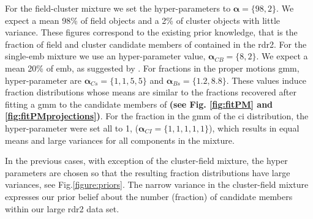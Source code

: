 For the field-cluster mixture we set the hyper-parameters to $\boldsymbol{\alpha}=\{98,2\}$. We expect a mean 98\% of field objects and a 2\% of cluster objects with little variance. These figures correspond to the existing prior knowledge, that is the fraction of field and cluster candidate members of \citet{Bouy2015} contained in the \gls{rdr2}. 
For the single-\gls{emb} mixture we use an hyper-parameter value, $\boldsymbol{\alpha}_{CB}=\{8,2\}$. We expect a mean 20\% of \gls{emb}, as suggested by \citet{Bouy2015}. 
For fractions in the proper motions \gls{gmm}, hyper-parameter are $\boldsymbol{\alpha}_{Cs}=\{1,1,5,5\}$ and $\boldsymbol{\alpha}_{Bs}=\{1.2,8.8\}$. These values induce fraction distributions whose means are similar to the fractions recovered after fitting a \gls{gmm} to the  candidate members of \citet{Bouy2015} \textbf{(see Fig. \ref{fig:fitPM} and \ref{fig:fitPMprojections})}. 
For the fraction in the \gls{gmm} of the \gls{ci} distribution, the hyper-parameter were set all to 1, ($\boldsymbol{\alpha}_{CI}=\{1,1,1,1,1\}$), which results in equal means and large variances for all {components in the mixture}. 

{In the previous cases, with exception of the cluster-field mixture, the hyper parameters are chosen so that the resulting fraction distributions have large variances, see Fig.\ref{figure:priors}.} The narrow variance in the cluster-field mixture expresses our prior belief about the number (fraction) of candidate members within our large \gls{rdr2} data set.

